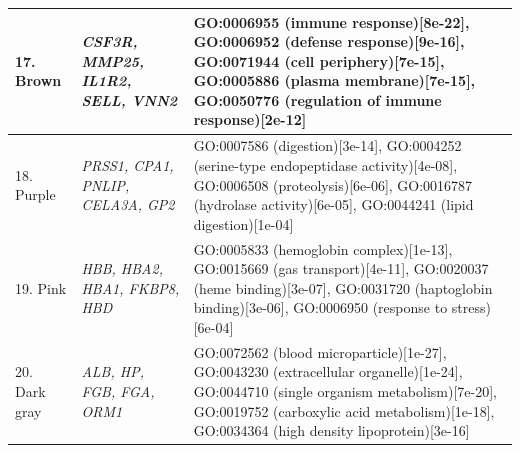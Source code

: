 \documentclass[10pt,letterpaper]{article}
\begin{document}
\begin{table}[!hp]
\begin{adjustwidth}{-2in}{0in}
\begin{tabular}{|p{1.0in}|p{1.5in}|p{4.3in}|}
17. Brown & \textit{CSF3R, MMP25, IL1R2, SELL, VNN2} & GO:0006955 (immune response)[8e-22], GO:0006952 (defense response)[9e-16], GO:0071944 (cell periphery)[7e-15], GO:0005886 (plasma membrane)[7e-15], GO:0050776 (regulation of immune response)[2e-12]\\ \hline
18. Purple & \textit{PRSS1, CPA1, PNLIP, CELA3A, GP2} & GO:0007586 (digestion)[3e-14], GO:0004252 (serine-type endopeptidase activity)[4e-08], GO:0006508 (proteolysis)[6e-06], GO:0016787 (hydrolase activity)[6e-05], GO:0044241 (lipid digestion)[1e-04]\\ \hline
19. Pink & \textit{HBB, HBA2, HBA1, FKBP8, HBD} & GO:0005833 (hemoglobin complex)[1e-13], GO:0015669 (gas transport)[4e-11], GO:0020037 (heme binding)[3e-07], GO:0031720 (haptoglobin binding)[3e-06], GO:0006950 (response to stress)[6e-04] \\ \hline
20. Dark gray  & \textit{ALB, HP, FGB, FGA, ORM1} & GO:0072562 (blood microparticle)[1e-27], GO:0043230 (extracellular organelle)[1e-24],  GO:0044710 (single organism metabolism)[7e-20], GO:0019752 (carboxylic acid metabolism)[1e-18], GO:0034364 (high density lipoprotein)[3e-16] \\ \hline
\end{tabular} \label{tab1}
\end{adjustwidth}
\end{table}
\end{document}
